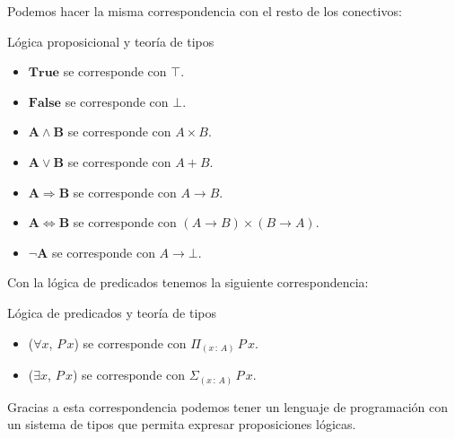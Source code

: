 \documentclass[xcolor=dvipsnames]{beamer} %
\newcommand{\tjud}[2]
  {\ensuremath{#1\,:\,#2}}
\newcommand{\depFun}[3] {
  {\ensuremath{\Pi_{(\tjud{#1}{#2})}\,#3\,#1}}
 }
\newcommand{\cprod}[2]
  {\ensuremath{#1 \times #2}
 }
\newcommand{\depPair}[3]
 {\ensuremath{\Sigma_{(\tjud{#1}{#2})}\,#3\,#1}
 }
\begin{document}
\begin{frame}
 \begin{block}{}
  Podemos hacer la misma correspondencia con el resto de los conectivos:
 \end{block}

 \pause
 
 \begin{block}{Lógica proposicional y teoría de tipos}
  \begin{itemize}
  \item $\mathbf{True}$ se corresponde con $\mathbf{\top}$.
  \item $\mathbf{False}$ se corresponde con $\mathbf{\bot}$.
  \item $\mathbf{A \wedge B}$ se corresponde con $\cprod{A}{B}$.
  \item $\mathbf{A \vee B}$ se corresponde con $A + B$.
  \item $\mathbf{A \Rightarrow B}$ se corresponde con $A \rightarrow B$.
  \item $\mathbf{A \Leftrightarrow B}$ se corresponde con $\cprod{(A \rightarrow B)}{(B \rightarrow A)}$.
  \item $\mathbf{\neg A}$ se corresponde con $A \rightarrow \mathbf{\bot}$.
\end{itemize}
 \end{block}

\end{frame}

\begin{frame}
  \begin{block}{}
    Con la lógica de predicados tenemos la siguiente correspondencia:
  \end{block}
  
  \pause
  
  \begin{block}{Lógica de predicados y teoría de tipos}
   \begin{itemize}
    \item ($\forall x$, $P\,x$) se corresponde con $\depFun{x}{A}{P}$.
    \item ($\exists x$, $P\,x$) se corresponde con $\depPair{x}{A}{P}$.
    \end{itemize}
  \end{block}

  \pause
  
  \begin{block}{}
   Gracias a esta correspondencia podemos tener un lenguaje de programación con un sistema
   de tipos que permita expresar proposiciones lógicas.
  \end{block}

  
\end{frame}
\end{document}
